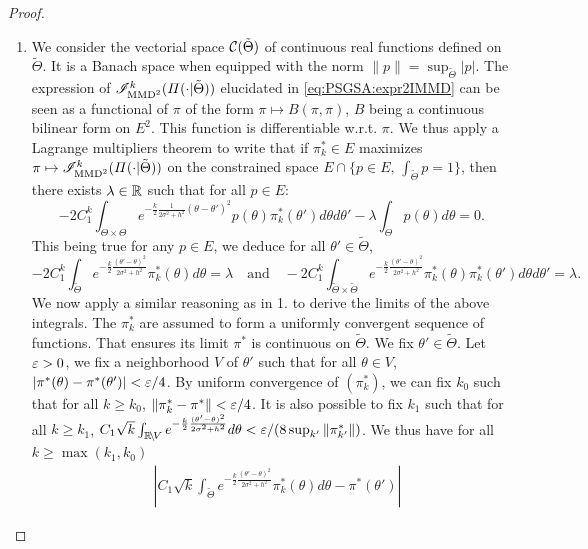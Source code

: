 \begin{proof}
\begin{enumerate}
\item We consider the vectorial space $\mathcal{C}(\tilde\Theta)$ of continuous real functions defined on $\tilde\Theta$. It is a Banach space when equipped with the norm $\|p\|=\sup_{\tilde\Theta}|p|$. The expression of $\mathscr{I}_{\text{MMD}^2}^k(\varPi(\cdot|\tilde\Theta))$ elucidated in \cref{eq:PSGSA:expr2IMMD} can be seen as a functional of $\pi$ of the form $\pi\mapsto B(\pi,\pi)$, $B$ being a continuous bilinear form on $E^2$. This function is differentiable w.r.t. $\pi$. We thus  apply a Lagrange multipliers theorem to write that if $\pi_k^\ast\in E$ maximizes $\pi\mapsto\mathscr{I}^k_{\text{MMD}^2}(\varPi(\cdot|\tilde\Theta))$ on the constrained space $E\cap\{p\in E,\,\int_{\tilde\Theta}p=1\}$, then there exists $\lambda\in\mathbb{R}$ such that for all $p\in E$:
\begin{equation}
    -2C_1^k\int_{\Theta\times\Theta} e^{-\frac{k}{2}\frac{1}{2\sigma^2+h^2}(\theta-\theta')^2} p(\theta)\pi^\ast_k(\theta')d\theta d\theta' - \lambda\int_\Theta p(\theta)d\theta = 0.
\end{equation}
This being true for any $p\in E$, we deduce for all $\theta'\in\tilde\Theta$, %
    \begin{equation}
        -2C_1^k\int_{\tilde\Theta} e^{-\frac{k}{2}\frac{(\theta'-\theta)^2}{2\sigma^2+h^2}} \pi_k^\ast(\theta)d\theta = \lambda \quad\text{and}\quad
        -2C_1^k\int_{\tilde\Theta\times\tilde\Theta} e^{-\frac{k}{2}\frac{(\theta'-\theta)^2}{2\sigma^2+h^2}} \pi_k^\ast(\theta)\pi_k^\ast(\theta')d\theta d\theta' = \lambda.
    \end{equation}
We now apply a similar reasoning as in 1. to derive the limits of the above integrals. 
The $\pi^\ast_k$ are assumed to form a uniformly convergent sequence of functions. That ensures its limit $\pi^\ast$ is continuous on $\tilde\Theta$.
We fix $\theta'\in\tilde\Theta$. Let $\varepsilon>0$, we fix a neighborhood $V$ of $\theta'$ such that for all $\theta \in V$, $|\pi^\ast(\theta)-\pi^\ast(\theta')|<\varepsilon/4$. By uniform convergence of $(\pi^\ast_k)$, we can fix $k_0$ such that for all $k\geq k_0$, $\|\pi^\ast_k-\pi^\ast\|<\varepsilon/4$. It is also possible to fix $k_1$ such that for all $k\geq k_1$, $C_1\sqrt{k}\int_{\mathbb{R}\!\setminus\!V} e^{-\frac{k}{2}\frac{(\theta'-\theta)^2}{2\sigma^2+h^2}}d\theta <\varepsilon/(8\sup_{k'}\|\pi^\ast_{k'}\|)$.
    We thus have for all $k\geq\max(k_1,k_0)$
    \begin{equation}
        \begin{aligned}
        &\left|C_1\sqrt{k}\int_{\tilde\Theta } e^{-\frac{k}{2}\frac{(\theta'-\theta)^2}{2\sigma^2+h^2}} \pi^\ast_k(\theta)d\theta - \pi^\ast(\theta') \right| 

\end{aligned}
\end{equation}
\end{enumerate}
\end{proof}
